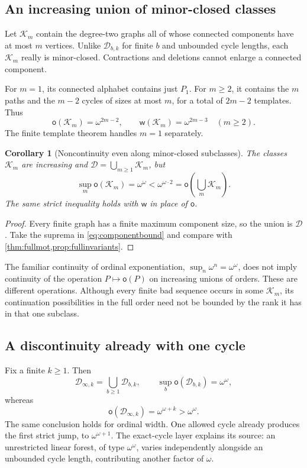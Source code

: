 \documentclass[11pt,letterpaper]{article}
\theoremstyle{plain}
\newtheorem{corollary}[corollary]{Corollary}
\theoremstyle{definition}
\theoremstyle{remark}
\newcommand{\mot}{\mathsf o}
\newcommand{\wid}{\mathsf w}
\newcommand{\DG}{\mathcal D}
\newcommand{\Inf}{\infty}
\begin{document}
\subsection{An increasing union of minor-closed classes}

Let $\mathcal K_m$ contain the degree-two graphs all of whose
connected components have at most $m$ vertices. Unlike
$\DG_{b,k}$ for finite $b$ and unbounded cycle lengths, each
$\mathcal K_m$ really is minor-closed. Contractions and deletions
cannot enlarge a connected component.

For $m=1$, its connected alphabet contains just $P_1$.
For $m\ge2$, it contains the $m$ paths and the $m-2$ cycles of sizes
at most $m$, for a total of $2m-2$ templates. Thus
\begin{equation}\label{eq:componentbound}
 \mot(\mathcal K_m)=\omega^{2m-2},\qquad
 \wid(\mathcal K_m)=\omega^{2m-3}
 \quad(m\ge2).
\end{equation}
The finite template theorem handles $m=1$ separately.

\begin{corollary}[Noncontinuity even along minor-closed subclasses]\label{cor:noncontinuity}
The classes $\mathcal K_m$ are increasing and
$\DG=\bigcup_{m\ge1}\mathcal K_m$, but
\[
 \sup_m\mot(\mathcal K_m)=\omega^\omega
 <\omega^{\omega\cdot2}=\mot\left(\bigcup_m\mathcal K_m\right).
\]
The same strict inequality holds with $\wid$ in place of $\mot$.
\end{corollary}

\begin{proof}
Every finite graph has a finite maximum component size, so the union
is $\DG$. Take the suprema in \cref{eq:componentbound} and compare
with \cref{thm:fullmot,prop:fullinvariants}.
\end{proof}

The familiar continuity of ordinal exponentiation,
$\sup_n\omega^n=\omega^\omega$, does not imply continuity of the
operation $P\mapsto\mot(P)$ on increasing unions of orders. These
are different operations. Although every finite bad sequence occurs
in some $\mathcal K_m$, its continuation possibilities in the full
order need not be bounded by the rank it has in that one subclass.

\subsection{A discontinuity already with one cycle}

Fix a finite $k\ge1$. Then
\[
 \DG_{\Inf,k}=\bigcup_{b\ge1}\DG_{b,k},
 \qquad
 \sup_b\mot(\DG_{b,k})=\omega^\omega,
\]
whereas
\[
 \mot(\DG_{\Inf,k})=\omega^{\omega+k}>\omega^\omega.
\]
The same conclusion holds for ordinal width. One allowed cycle
already produces the first strict jump, to $\omega^{\omega+1}$.
The exact-cycle layer explains its source: an unrestricted linear
forest, of type $\omega^\omega$, varies independently alongside an
unbounded cycle length, contributing another factor of $\omega$.
\end{document}
